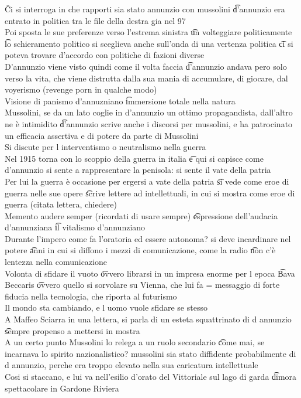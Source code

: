 \documentclass[12pt]{article}
\begin{document}
\v

Ci si interroga in che rapporti sia stato annunzio con mussolini \t d'annunzio era entrato in politica tra le file della destra gia nel 97 \\
Poi sposta le sue preferenze verso l'estrema sinistra \t un volteggiare politicamente \t lo schieramento politico si sceglieva anche sull'onda di una vertenza politica \t ci si poteva trovare d'accordo con politiche di fazioni diverse \\
D'annunzio viene visto quindi come il volta faccia \t d'annunzio andava pero solo verso la vita, che viene distrutta dalla sua mania di accumulare, di giocare, dal voyerismo (revenge porn in qualche modo) \\
Visione di panismo d'annuzniano \t immersione totale nella natura \\
Mussolini, se da un lato coglie in d'annunzio un ottimo propagandista, dall'altro ne è intimidito \t d'annunzio scrive anche i discorsi per mussolini, e ha patrocinato un efficacia assertiva e di potere da parte di Mussolini \\
Si discute per l interventismo o neutralismo nella guerra \\
Nel 1915 torna con lo scoppio della guerra in italia \t e qui si capisce come d'annunzio si sente a rappresentare la penisola: si sente il vate della patria \\
Per lui la guerra è occasione per ergersi a vate della patria \t si vede come eroe di guerra nelle sue opere \t scrive lettere ad intellettuali, in cui si mostra come eroe di guerra (citata lettera, chiedere) \\
Memento audere semper (ricordati di usare sempre) \t espressione dell'audacia d'annunziana \t il vitalismo d'annunziano \\
Durante l'impero come fa l'oratoria ed essere autonoma? si deve incardinare nel potere \t anni in cui si diffono i mezzi di comunicazione, come la radio \t non c'è lentezza nella comunicazione \\
Volonta di sfidare il vuoto \t ovvero librarsi in un impresa enorme per l epoca \t Bava Beccaris \t ovvero quello si sorvolare su Vienna, che lui fa = messaggio di forte fiducia nella tecnologia, che riporta al futurismo \\
Il mondo sta cambiando, e l uomo vuole sfidare se stesso \\
A Maffeo Sciarra in una lettera, si parla di un esteta squattrinato di d annunzio \t sempre propenso a mettersi in mostra \\
A un certo punto Mussolini lo relega a un ruolo secondario \t come mai, se incarnava lo spirito nazionalistico? mussolini sia stato diffidente probabilmente di d annunzio, perche era troppo elevato nella sua caricatura intellettuale \\
Cosi si staccano, e lui va nell'esilio d'orato del Vittoriale sul lago di garda \t dimora spettacolare in Gardone Riviera
\end{document}
